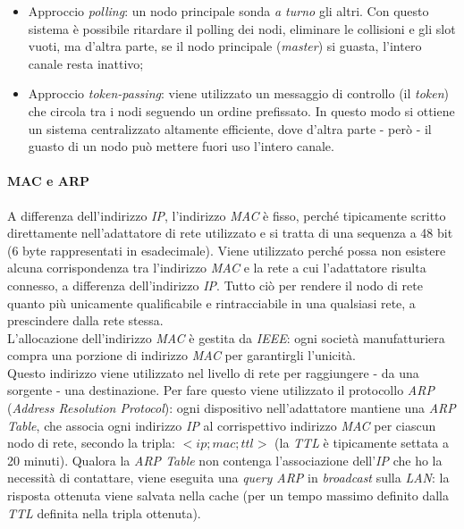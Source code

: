 \begin{itemize}
\begin{itemize}
		\item Approccio \textit{polling}: un nodo principale sonda \textit{a turno} gli altri. Con questo sistema è possibile ritardare il polling dei nodi, eliminare le collisioni e gli slot vuoti, ma d'altra parte, se il nodo principale (\textit{master}) si guasta, l'intero canale resta inattivo;
		\item Approccio \textit{token-passing}: viene utilizzato un messaggio di controllo (il \textit{token}) che circola tra i nodi seguendo un ordine prefissato. In questo modo si ottiene un sistema centralizzato altamente efficiente, dove d'altra parte - però - il guasto di un nodo può mettere fuori uso l'intero canale.
	\end{itemize}
\end{itemize}

\paragraph{MAC e ARP}
A differenza dell'indirizzo \textit{IP}, l'indirizzo \textit{MAC} è fisso, perché tipicamente scritto direttamente nell'adattatore di rete utilizzato e si tratta di una sequenza a 48 bit (6 byte rappresentati in esadecimale). Viene utilizzato perché possa non esistere alcuna corrispondenza tra l'indirizzo \textit{MAC} e la rete a cui l'adattatore risulta connesso, a differenza dell'indirizzo \textit{IP}. Tutto ciò per rendere il nodo di rete quanto più unicamente qualificabile e rintracciabile in una qualsiasi rete, a prescindere dalla rete stessa. \\
L'allocazione dell'indirizzo \textit{MAC} è gestita da \textit{IEEE}: ogni società manufatturiera compra una porzione di indirizzo \textit{MAC} per garantirgli l'unicità. \\
Questo indirizzo viene utilizzato nel livello di rete per raggiungere - da una sorgente - una destinazione. Per fare questo viene utilizzato il protocollo \textit{ARP} (\textit{Address Resolution Protocol}): ogni dispositivo nell'adattatore mantiene una \textit{ARP Table}, che associa ogni indirizzo \textit{IP} al corrispettivo indirizzo \textit{MAC} per ciascun nodo di rete, secondo la tripla: $<ip;mac;ttl>$ (la \textit{TTL} è tipicamente settata a 20 minuti). Qualora la \textit{ARP Table} non contenga l'associazione dell'\textit{IP} che ho la necessità di contattare, viene eseguita una \textit{query ARP} in \textit{broadcast} sulla \textit{LAN}: la risposta ottenuta viene salvata nella cache (per un tempo massimo definito dalla \textit{TTL} definita nella tripla ottenuta). \\
